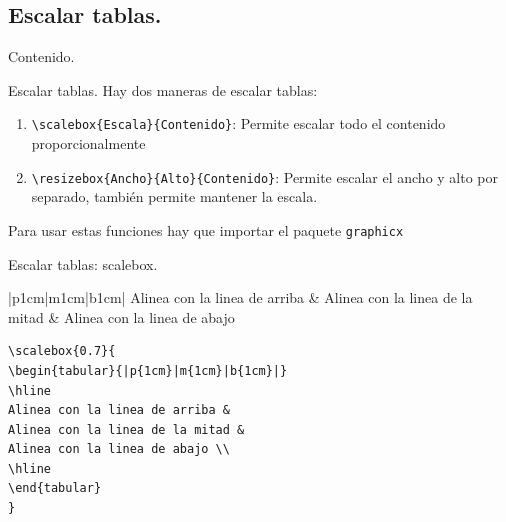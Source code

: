 \documentclass[dvipsnames,xcolor, handout]{beamer}
\theoremstyle{plain}
\theoremstyle{definition}
\begin{document}
\subsection{Escalar tablas.}
\begin{frame}{Contenido.}
\begin{multicols}{2}
  \tableofcontents[currentsubsection]
\end{multicols}
\end{frame}

\begin{frame}[fragile]{Escalar tablas.}
Hay dos maneras de escalar tablas:
\begin{enumerate}
    \item \verb!\scalebox{Escala}{Contenido}!: Permite escalar todo el contenido proporcionalmente
    \item \verb!\resizebox{Ancho}{Alto}{Contenido}!: Permite escalar el ancho y alto por separado, también permite mantener la escala.
\end{enumerate}

Para usar estas funciones hay que importar el paquete \verb!graphicx!
\end{frame}

\begin{frame}[fragile]{Escalar tablas: scalebox.}
\begin{center}
\footnotesize
\begin{tabular}{|p{1cm}|m{1cm}|b{1cm}|}
\hline
Alinea con la linea de arriba & 
Alinea con la linea de la mitad &
Alinea con la linea de abajo \\
\hline
\end{tabular}
\end{center}
\begin{minipage}{0.6\linewidth}
\footnotesize
\begin{verbatim}
\scalebox{0.7}{
\begin{tabular}{|p{1cm}|m{1cm}|b{1cm}|}
\hline
Alinea con la linea de arriba & 
Alinea con la linea de la mitad &
Alinea con la linea de abajo \\
\hline
\end{tabular}
}
\end{verbatim}
\end{minipage}\pause
\begin{minipage}{0.39\linewidth}
\footnotesize
\centering
{}
\end{minipage}

\end{frame}
\end{document}
